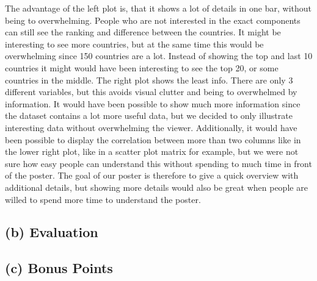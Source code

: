 \documentclass[a4paper]{article}
\begin{document}
The advantage of the left plot is, that it shows a lot of details in one bar, without being to overwhelming. 
People who are not interested in the exact components can still see the ranking and difference between the countries. 
It might be interesting to see more countries, but at the same time this would be overwhelming since 150 countries are a lot. 
Instead of showing the top and last 10 countries it might would have been interesting to see the top 20, or some countries in the middle. 
The right plot shows the least info. 
There are only 3 different variables, but this avoids visual clutter and being to overwhelmed by information. 
It would have been possible to show much more information since the dataset contains a lot more useful data, but we decided to only illustrate interesting data without overwhelming the viewer. 
Additionally, it would have been possible to display the correlation between more than two columns like in the lower right plot, like in a scatter plot matrix for example, but we were not sure how easy people can understand this without spending to much time in front of the poster. 
The goal of our poster is therefore to give a quick overview with additional details, but showing more details would also be great when people are willed to spend more time to understand the poster. 


\subsection*{(b) Evaluation}
\subsection*{(c) Bonus Points}
\end{document}
